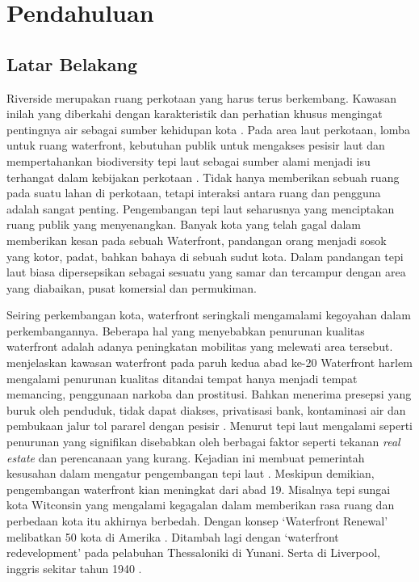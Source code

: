 \documentclass[../thesis.tex]{subfiles}
\begin{document}
\chapter{Pendahuluan}\label{chap:pendahuluan}
\section{Latar Belakang}

Riverside merupakan ruang perkotaan yang harus terus berkembang. Kawasan inilah yang diberkahi dengan karakteristik dan perhatian khusus mengingat pentingnya air sebagai sumber kehidupan kota \citep{shamsuddin2013}.
Pada area laut perkotaan, lomba untuk ruang waterfront, kebutuhan publik untuk mengakses pesisir laut dan mempertahankan biodiversity tepi laut sebagai sumber alami menjadi isu terhangat dalam kebijakan perkotaan \citep{breen1994waterfronts}.
Tidak hanya memberikan sebuah ruang pada suatu lahan di perkotaan, tetapi interaksi antara ruang dan pengguna adalah sangat penting. Pengembangan tepi laut seharusnya yang menciptakan ruang publik yang menyenangkan. Banyak kota yang telah gagal dalam memberikan kesan pada sebuah Waterfront, pandangan orang menjadi sosok yang kotor, padat, bahkan bahaya di sebuah sudut kota. Dalam pandangan \cite{goodwin1999} tepi laut biasa dipersepsikan sebagai sesuatu yang samar dan tercampur dengan area yang diabaikan, pusat komersial dan permukiman.


Seiring perkembangan kota, waterfront seringkali mengamalami kegoyahan dalam perkembangannya. Beberapa hal yang menyebabkan penurunan kualitas  waterfront adalah adanya peningkatan mobilitas yang melewati area tersebut\citep{richarda.lehmann1966}. \cite{ulam2009} menjelaskan kawasan waterfront pada paruh kedua abad ke-20 Waterfront harlem mengalami penurunan kualitas ditandai tempat hanya menjadi tempat memancing, penggunaan narkoba dan prostitusi. Bahkan menerima presepsi yang buruk oleh penduduk, tidak dapat diakses, privatisasi bank, kontaminasi air dan pembukaan jalur tol pararel dengan pesisir \citep{shamsuddin2013}. Menurut \cite{benages2015revisiting} tepi laut mengalami seperti penurunan yang signifikan disebabkan oleh berbagai faktor seperti tekanan \textit{real estate} dan perencanaan yang kurang. Kejadian ini membuat pemerintah kesusahan dalam mengatur pengembangan tepi laut \citep{gripaios1999ports}.
Meskipun demikian, pengembangan waterfront kian meningkat dari abad 19. Misalnya tepi sungai kota Witconsin yang mengalami kegagalan dalam memberikan rasa ruang dan perbedaan kota itu akhirnya berbedah. Dengan konsep `Waterfront Renewal' melibatkan 50 kota di Amerika \citep{richarda.lehmann1966}. Ditambah lagi dengan `waterfront redevelopment' pada pelabuhan Thessaloniki di Yunani. Serta di Liverpool, inggris sekitar tahun 1940 \citep{couch2003city}.
\end{document}
